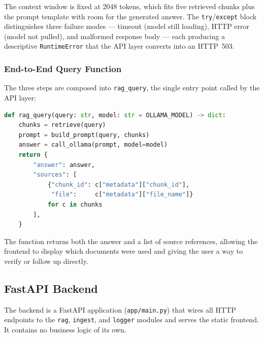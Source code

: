 The context window is fixed at 2048 tokens, which fits five retrieved chunks
plus the prompt template with room for the generated answer. The
\texttt{try}/\texttt{except} block distinguishes three failure modes — timeout
(model still loading), HTTP error (model not pulled), and malformed response
body — each producing a descriptive \texttt{RuntimeError} that the API layer
converts into an HTTP~503.

\subsubsection{End-to-End Query Function}

The three steps are composed into \texttt{rag\_query}, the single entry point
called by the API layer:

\begin{lstlisting}[language=Python]
def rag_query(query: str, model: str = OLLAMA_MODEL) -> dict:
    chunks = retrieve(query)
    prompt = build_prompt(query, chunks)
    answer = call_ollama(prompt, model=model)
    return {
        "answer": answer,
        "sources": [
            {"chunk_id": c["metadata"]["chunk_id"],
             "file":     c["metadata"]["file_name"]}
            for c in chunks
        ],
    }
\end{lstlisting}

The function returns both the answer and a list of source references, allowing
the frontend to display which documents were used and giving the user a way to
verify or follow up directly.

\subsection{FastAPI Backend}
\label{sec:impl-backend}

The backend is a FastAPI application (\texttt{app/main.py}) that wires all
HTTP endpoints to the \texttt{rag}, \texttt{ingest}, and \texttt{logger}
modules and serves the static frontend. It contains no business logic of its
own.

